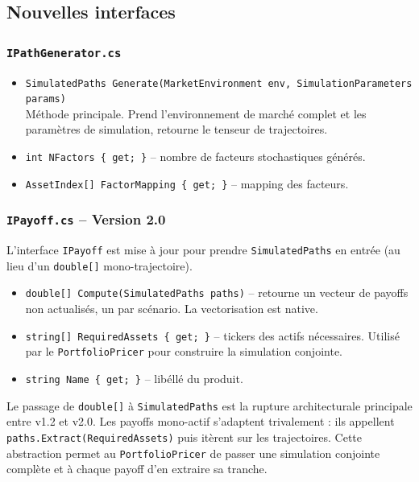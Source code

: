 \documentclass[a4paper,11pt]{article}
\newcommand{\cs}[1]{\texttt{\color{codeinline}#1}}
\begin{document}
\subsection{Nouvelles interfaces}

\subsubsection{\texttt{IPathGenerator.cs}}

\begin{itemize}[leftmargin=1.5em]
  \item \cs{SimulatedPaths Generate(MarketEnvironment env, SimulationParameters params)} \\
        M\'ethode principale. Prend l'environnement de march\'e complet et les param\`etres
        de simulation, retourne le tenseur de trajectoires.
  \item \cs{int NFactors \{ get; \}} -- nombre de facteurs stochastiques g\'en\'er\'es.
  \item \cs{AssetIndex[] FactorMapping \{ get; \}} -- mapping des facteurs.
\end{itemize}

\subsubsection{\texttt{IPayoff.cs} -- Version 2.0}

L'interface \cs{IPayoff} est mise \`a jour pour prendre \cs{SimulatedPaths} en entr\'ee
(au lieu d'un \cs{double[]} mono-trajectoire).

\begin{itemize}[leftmargin=1.5em]
  \item \cs{double[] Compute(SimulatedPaths paths)} -- retourne un vecteur de payoffs
        non actualis\'es, un par sc\'enario. La vectorisation est native.
  \item \cs{string[] RequiredAssets \{ get; \}} -- tickers des actifs n\'ecessaires.
        Utilis\'e par le \cs{PortfolioPricer} pour construire la simulation conjointe.
  \item \cs{string Name \{ get; \}} -- lib\'ell\'e du produit.
\end{itemize}

\begin{tcolorbox}[note]
Le passage de \cs{double[]} \`a \cs{SimulatedPaths} est la rupture architecturale
principale entre v1.2 et v2.0. Les payoffs mono-actif s'adaptent trivalement :
ils appellent \cs{paths.Extract(RequiredAssets)} puis it\`erent sur les trajectoires.
Cette abstraction permet au \cs{PortfolioPricer} de passer une simulation conjointe
compl\`ete et \`a chaque payoff d'en extraire sa tranche.
\end{tcolorbox}
\end{document}
